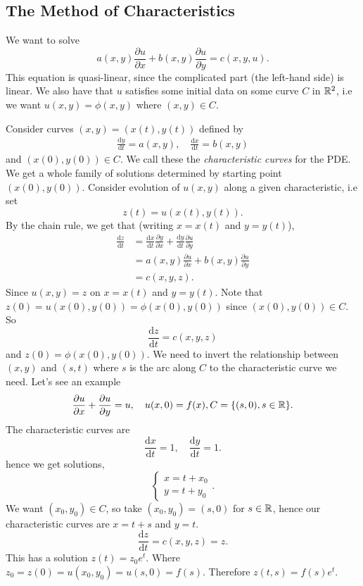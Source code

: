 \documentclass{article}
\begin{document}
\subsection{The Method of Characteristics}
We want to solve 
\[
	a(x,y)\frac{\partial u}{\partial x}+b(x,y)\frac{\partial u}{\partial y}=c(x,y,u).
\]
This equation is quasi-linear, since the complicated part (the left-hand side) is linear. We also have that $ u $ satisfies some initial data on some curve $ C $ in $ \mathbb{R}^2 $, i.e we want $ u(x,y)=\phi(x,y) $ where $ (x,y)\in C $.
\par
Consider curves $ (x,y)=(x(t),y(t)) $ defined by
\begin{align*}
	\frac{\mathrm dy}{\mathrm dt}=a(x,y), \quad \frac{\mathrm dx}{\mathrm dt}=b(x,y)
\end{align*}
and $ (x(0),y(0))\in C $. We call these the \textit{characteristic curves} for the PDE. We get a whole family of solutions determined by starting point $ (x(0),y(0)) $. Consider evolution of $ u(x,y) $ along a given characteristic, i.e set 
\[
  z(t)=u(x(t),y(t)).
\]
By the chain rule, we get that (writing $ x=x(t) $ and $ y=y(t) $),
\begin{align*}
	\frac{\mathrm dz}{\mathrm dt}&=\frac{\mathrm dx}{\mathrm dt}\frac{\partial y}{\partial x}+\frac{\mathrm dy}{\mathrm dt}\frac{\partial u}{\partial y}\\
				     &= a(x,y)\frac{\partial u}{\partial x}+b(x,y)\frac{\partial u}{\partial y}\\
				     &=c(x,y,z).
\end{align*}
Since $ u(x,y)=z $ on $ x=x(t) $ and $ y=y(t) $. Note that $ z(0)=u(x(0),y(0))=\phi(x(0),y(0)) $ since $ (x(0),y(0))\in C $. So
\[
	\frac{\mathrm dz}{\mathrm dt}=c(x,y,z)
\]
and $ z(0)=\phi(x(0),y(0)) $. We need to invert the relationship between $ (x,y) $ and $ (s,t) $ where $ s $ is the arc along $ C $ to the characteristic curve we need. Let's see an example
\[
	\frac{\partial u}{\partial x}+\frac{\partial u}{\partial y}=u,\quad u(x,0)=f(x), C=\{(s,0), s\in \mathbb{R}\}.
\]
The characteristic curves are
\[
	\frac{\mathrm dx}{\mathrm dt}=1,\quad \frac{\mathrm dy}{\mathrm dt}=1.
\]
hence we get solutions,
\[
  \begin{cases}
    x=t+x_0 \\
    y=t+y_0
  \end{cases}.
\]
We want $ (x_0,y_0)\in C $, so take $ (x_0,y_0)=(s,0) $ for $ s\in \mathbb{R} $, hence our characteristic curves are $ x=t+s $ and $ y=t $.
\[
	\frac{\mathrm dz}{\mathrm dt}=c(x,y,z)=z.
\]
This has a solution $ z(t)=z_0e^t $. Where $ z_0=z(0)=u(x_0,y_0)=u(s,0)=f(s) $. Therefore $ z(t,s)=f(s)e^t $.\par
\end{document}
